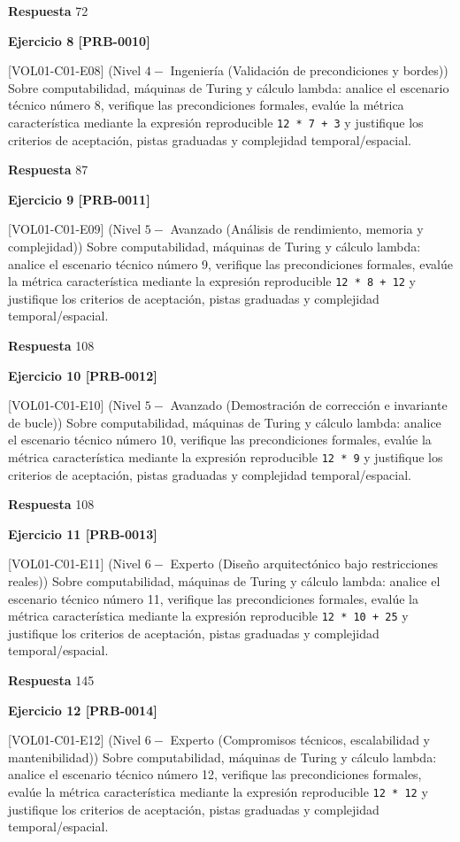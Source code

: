 \documentclass{book}
\begin{document}
\noindent\textbf{Respuesta} 72

\noindent\textbf{Ejercicio 8 [PRB-0010]}

[VOL01-C01-E08] (Nivel \(4 -\) Ingeniería (Validación de precondiciones y bordes)) Sobre computabilidad, máquinas de Turing y cálculo lambda: analice el escenario técnico número 8, verifique las precondiciones formales, evalúe la métrica característica mediante la expresión reproducible \texttt{12 * 7 + 3} y justifique los criterios de aceptación, pistas graduadas y complejidad temporal/espacial.

\noindent\textbf{Respuesta} 87

\noindent\textbf{Ejercicio 9 [PRB-0011]}

[VOL01-C01-E09] (Nivel \(5 -\) Avanzado (Análisis de rendimiento, memoria y complejidad)) Sobre computabilidad, máquinas de Turing y cálculo lambda: analice el escenario técnico número 9, verifique las precondiciones formales, evalúe la métrica característica mediante la expresión reproducible \texttt{12 * 8 + 12} y justifique los criterios de aceptación, pistas graduadas y complejidad temporal/espacial.

\noindent\textbf{Respuesta} 108

\noindent\textbf{Ejercicio 10 [PRB-0012]}

[VOL01-C01-E10] (Nivel \(5 -\) Avanzado (Demostración de corrección e invariante de bucle)) Sobre computabilidad, máquinas de Turing y cálculo lambda: analice el escenario técnico número 10, verifique las precondiciones formales, evalúe la métrica característica mediante la expresión reproducible \texttt{12 * 9} y justifique los criterios de aceptación, pistas graduadas y complejidad temporal/espacial.

\noindent\textbf{Respuesta} 108

\noindent\textbf{Ejercicio 11 [PRB-0013]}

[VOL01-C01-E11] (Nivel \(6 -\) Experto (Diseño arquitectónico bajo restricciones reales)) Sobre computabilidad, máquinas de Turing y cálculo lambda: analice el escenario técnico número 11, verifique las precondiciones formales, evalúe la métrica característica mediante la expresión reproducible \texttt{12 * 10 + 25} y justifique los criterios de aceptación, pistas graduadas y complejidad temporal/espacial.

\noindent\textbf{Respuesta} 145

\noindent\textbf{Ejercicio 12 [PRB-0014]}

[VOL01-C01-E12] (Nivel \(6 -\) Experto (Compromisos técnicos, escalabilidad y mantenibilidad)) Sobre computabilidad, máquinas de Turing y cálculo lambda: analice el escenario técnico número 12, verifique las precondiciones formales, evalúe la métrica característica mediante la expresión reproducible \texttt{12 * 12} y justifique los criterios de aceptación, pistas graduadas y complejidad temporal/espacial.
\end{document}
